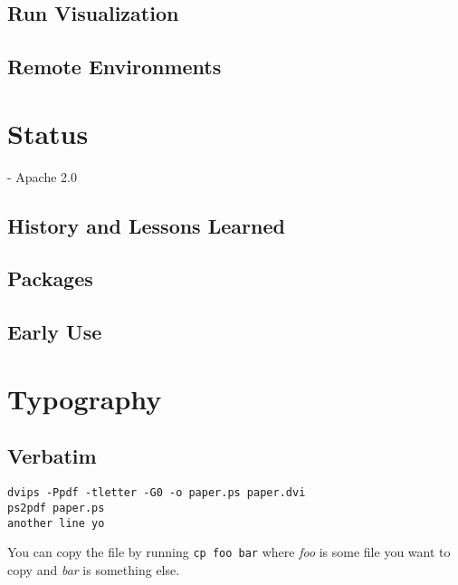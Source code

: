\documentclass{article}
\begin{document}
\subsection{Run Visualization}

\subsection{Remote Environments}

\section{Status}

- Apache 2.0

\subsection{History and Lessons Learned}

\subsection{Packages}

\subsection{Early Use}


\section{Typography}


\subsection{Verbatim}

{\footnotesize
\begin{verbatim}
dvips -Ppdf -tletter -G0 -o paper.ps paper.dvi
ps2pdf paper.ps
another line yo
\end{verbatim}}

You can copy the file by running \verb|cp foo bar| where \textit{foo}
is some file you want to copy and \textit{bar} is something else.
\end{document}
